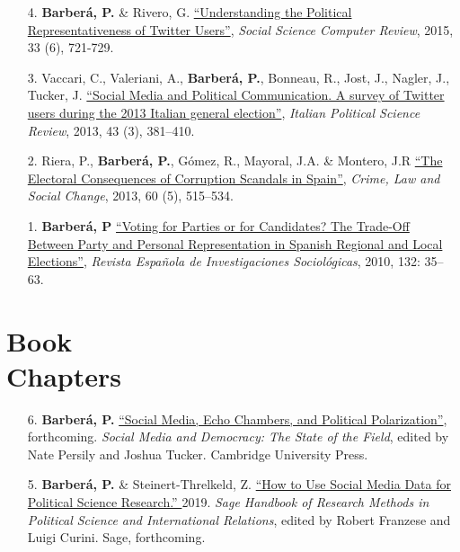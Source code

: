 \documentclass[margin,line,11pt]{resume}
\begin{document}
\begin{resume}
\begin{itemize}[leftmargin=5.5mm]
\item[4.] \textbf{Barber\'{a}, P.} \& Rivero, G. \href{http://ssc.sagepub.com/content/33/6/712}{``Understanding the Political Representativeness of Twitter Users''}, \textit{Social Science Computer Review}, 2015, 33 (6), 721-729.

\newpage 

\item[3.] Vaccari, C., Valeriani, A., \textbf{Barber\'{a}, P.}, Bonneau, R., Jost, J., Nagler, J., Tucker, J. \href{http://www.rivisteweb.it/doi/10.1426/75245}{``Social Media and Political Communication. A survey of Twitter users during the 2013 Italian general election''}, \emph{Italian Political Science Review}, 2013, 43 (3), 381--410.

\item[2.] Riera, P., \textbf{Barber\'{a}, P.}, G\'{o}mez, R., Mayoral, J.A. \& Montero, J.R \href{http://link.springer.com/article/10.1007/s10611-013-9479-1}{``The Electoral Consequences of Corruption Scandals in Spain''}, \emph{Crime, Law and Social Change}, 2013, 60 (5), 515--534.

\item[1.] \textbf{Barber\'{a}, P} \href{http://www.reis.cis.es/REIS/PDF/REIS_132_021285919804928.pdf}{``Voting for Parties or for Candidates? The Trade-Off Between Party and Personal Representation in Spanish Regional and Local Elections''}, \emph{Revista Espa\~{n}ola de Investigaciones Sociol\'{o}gicas}, 2010, 132: 35--63.

\end{itemize}    



\section{\mysidestyle Book\\Chapters} 
\vspace{.15cm}    
\begin{itemize}[leftmargin=5.5mm]
\item[6.] \textbf{Barber\'{a}, P.} \href{http://www.pablobarbera.com/static/echo-chambers.pdf}{``Social Media, Echo Chambers, and Political Polarization''}, forthcoming. \textit{Social Media and Democracy: The State of the Field}, edited by Nate Persily and Joshua Tucker. Cambridge University Press.

\item[5.] \textbf{Barber\'{a}, P.} \& Steinert-Threlkeld, Z. \href{http://www.pablobarbera.com/static/social-media-data-generators.pdf}{``How to Use Social Media Data for Political Science Research.'' } 2019. \textit{Sage Handbook of Research Methods in Political Science and International Relations}, edited by Robert Franzese and Luigi Curini. Sage, forthcoming.


\end{itemize}
\end{resume}
\end{document}
